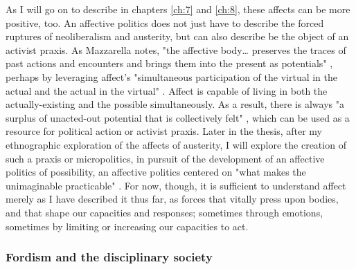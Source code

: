 As I will go on to describe in chapters \ref{ch:7} and \ref{ch:8}, these affects can be more positive, too. An affective politics does not just have to describe the forced ruptures of neoliberalism and austerity, but can also describe be the object of an activist praxis. As Mazzarella notes, "the affective body… preserves the traces of past actions and encounters and brings them into the present as potentials" \citep[p. 292]{mazzarella_affect_2011}, perhaps by leveraging affect's "simultaneous participation of the virtual in the actual and the actual in the virtual" \citep[p. 96]{massumi_autonomy_1995}. Affect is capable of living in both the actually-existing and the possible simultaneously. As a result, there is always "a surplus of unacted-out potential that is collectively felt" \citep[p. 58]{massumi_politics_2015}, which can be used as a resource for political action or activist praxis. Later in the thesis, after my ethnographic exploration of the affects of austerity, I will explore the creation of such a praxis or micropolitics, in pursuit of the development of an affective politics of possibility, an affective politics centered on "what makes the unimaginable practicable" \citep[p. 82]{massumi_politics_2015}. For now, though, it is sufficient to understand affect merely as I have described it thus far, as forces that vitally press upon bodies, and that shape our capacities and responses; sometimes through emotions, sometimes by limiting or increasing our capacities to act.

\subsubsection{Fordism and the disciplinary society}
\label{subsubsec:fordism-and-the-disciplinary-society}

